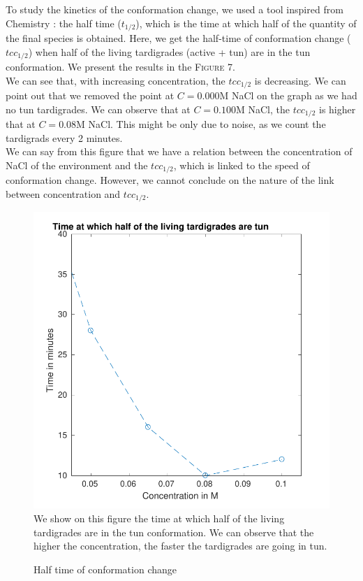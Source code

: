 \documentclass[12pt,a4paper, twocolumn]{article}
\begin{document}
To study the kinetics of the conformation change, we used a tool inspired from Chemistry : the half time ($t_{1/2}$), which is the time at which half of the quantity of the final species is obtained. Here, we get the half-time of conformation change ($tcc_{1/2}$) when half of the living tardigrades (active + tun) are in the tun conformation. We present the results in the \textsc{Figure} 7.\\
We can see that, with increasing concentration, the $tcc_{1/2}$ is decreasing. We can point out that we removed the point at $C=0.000$M NaCl on the graph as we had no tun tardigrades. We can observe that at $C=0.100$M NaCl, the $tcc_{1/2}$ is higher that at $C=0.08$M NaCl. This might be only due to noise, as we count the tardigrads every 2 minutes.\\
We can say from this figure that we have a relation between the concentration of NaCl of the environment and the $tcc_{1/2}$, which is linked to the speed of conformation change. However, we cannot conclude on the nature of the link between concentration and $tcc_{1/2}$.\\

\begin{figure}
\includegraphics[width=\linewidth]{tcc.pdf}
\label{tcc}
We show on this figure the time at which half of the living tardigrades are in the tun conformation. We can observe that the higher the concentration, the faster the tardigrades are going in tun.
\caption{Half time of conformation change}
\end{figure}
\end{document}
